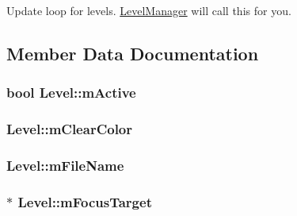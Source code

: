 Update loop for levels. \hyperlink{classLevelManager}{Level\+Manager} will call this for you. 



\subsection{Member Data Documentation}
\subsubsection[{\texorpdfstring{m\+Active}{mActive}}]{\setlength{\rightskip}{0pt plus 5cm}bool Level\+::m\+Active\hspace{0.3cm}{\ttfamily [private]}}\hypertarget{classLevel_a67463484bfba4f2bd5e9ea906a267f4a}{}\label{classLevel_a67463484bfba4f2bd5e9ea906a267f4a}
\subsubsection[{\texorpdfstring{m\+Clear\+Color}{mClearColor}}]{ Level\+::m\+Clear\+Color\hspace{0.3cm}{\ttfamily [private]}}\hypertarget{classLevel_a1138365d28ebc6c318fecb9bea2e4e26}{}\label{classLevel_a1138365d28ebc6c318fecb9bea2e4e26}
\subsubsection[{\texorpdfstring{m\+File\+Name}{mFileName}}]{ Level\+::m\+File\+Name\hspace{0.3cm}{\ttfamily [private]}}\hypertarget{classLevel_af1e1923aba1e95e5a8e895f840460407}{}\label{classLevel_af1e1923aba1e95e5a8e895f840460407}
\subsubsection[{\texorpdfstring{m\+Focus\+Target}{mFocusTarget}}]{$\ast$ Level\+::m\+Focus\+Target\hspace{0.3cm}{\ttfamily [private]}}\hypertarget{classLevel_a1bd8599f3ce15a8ae505fc84715e94c7}{}\label{classLevel_a1bd8599f3ce15a8ae505fc84715e94c7}
